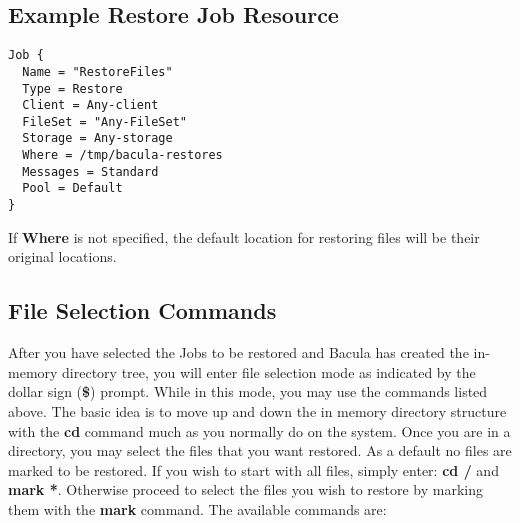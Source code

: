 \subsection*{Example Restore Job Resource}

\footnotesize
\begin{verbatim}
Job {
  Name = "RestoreFiles"
  Type = Restore
  Client = Any-client
  FileSet = "Any-FileSet"
  Storage = Any-storage
  Where = /tmp/bacula-restores
  Messages = Standard
  Pool = Default
}
\end{verbatim}
\normalsize

If {\bf Where} is not specified, the default location for restoring files will
be their original locations. 
\label{Selection}

\subsection*{File Selection Commands}

After you have selected the Jobs to be restored and Bacula has created the
in-memory directory tree, you will enter file selection mode as indicated by
the dollar sign ({\bf \$}) prompt. While in this mode, you may use the
commands listed above. The basic idea is to move up and down the in memory
directory structure with the {\bf cd} command much as you normally do on the
system. Once you are in a directory, you may select the files that you want
restored. As a default no files are marked to be restored. If you wish to
start with all files, simply enter: {\bf cd /} and {\bf mark *}. Otherwise
proceed to select the files you wish to restore by marking them with the {\bf
mark} command. The available commands are: 

